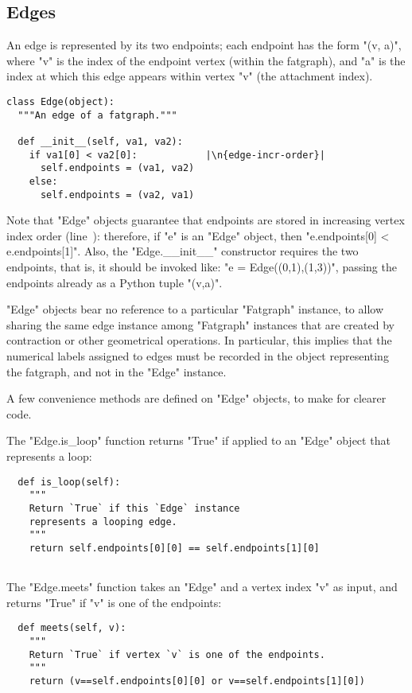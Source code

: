 \subsection{Edges}
\label{sec:edges}

An edge is represented by its two endpoints; each endpoint has the
form "(v, a)", where "v" is the index of the endpoint vertex
(within the fatgraph), and "a" is the index at which this edge
appears within vertex "v" (the attachment index).
\begin{lstlisting}
class Edge(object):
  """An edge of a fatgraph."""

  def __init__(self, va1, va2):
    if va1[0] < va2[0]:            |\n{edge-incr-order}|
      self.endpoints = (va1, va2)
    else:
      self.endpoints = (va2, va1)

\end{lstlisting}
Note that "Edge" objects guarantee that endpoints are stored in
increasing vertex index order (line~): therefore,
if "e" is an "Edge" object, then "e.endpoints[0] < e.endpoints[1]".
Also, the "Edge.__init__" constructor requires the two endpoints, that
is, it should be invoked like: "e = Edge((0,1),(1,3))", passing the
endpoints already as a Python tuple "(v,a)".

"Edge" objects bear no reference to a particular "Fatgraph" instance,
to allow sharing the same edge instance among "Fatgraph" instances that are
created by contraction or other geometrical operations.  In
particular, this implies that the numerical labels assigned to
edges must be recorded in the object representing the fatgraph, and
not in the "Edge" instance.

A few convenience methods are defined on "Edge" objects, to make for
clearer code.

The "Edge.is_loop" function returns "True" if applied to an
"Edge" object that represents a loop:
\begin{lstlisting}
  def is_loop(self):
    """
    Return `True` if this `Edge` instance 
    represents a looping edge.
    """
    return self.endpoints[0][0] == self.endpoints[1][0]
    
\end{lstlisting}

The "Edge.meets" function takes an "Edge" and a vertex index "v"
as input, and returns "True" if "v" is one of the endpoints:
\begin{lstlisting}
  def meets(self, v):
    """
    Return `True` if vertex `v` is one of the endpoints.
    """
    return (v==self.endpoints[0][0] or v==self.endpoints[1][0])

\end{lstlisting}

